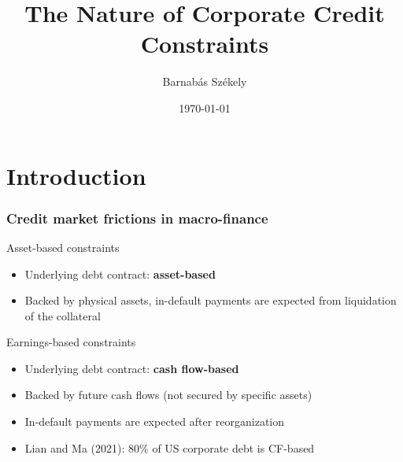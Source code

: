 \documentclass[notes]{beamer}
\title[]{The Nature of Corporate Credit Constraints} %
\author{Barnab\'as Sz\'ekely} %
\date{\today } %
\begin{document}
\renewcommand{\arraystretch}{1.4}

\begin{frame}
\titlepage %
\end{frame}


\section{Introduction}

\begin{frame}[label=intro1] \frametitle{Credit market frictions in macro-finance}
Asset-based constraints
\begin{itemize}
 \setlength\itemsep{0em}
    \item Underlying debt contract: \textbf{asset-based}
    \item Backed by physical assets, in-default payments are expected from liquidation of the collateral
\end{itemize} 

Earnings-based constraints
\begin{itemize}
 \setlength\itemsep{0em}
    \item Underlying debt contract: \textbf{cash flow-based}
    \item Backed by future cash flows (not secured by specific assets) 
    \item In-default payments are expected after reorganization
    \item Lian and Ma (2021): 80\% of US corporate debt is CF-based
\end{itemize} \vspace{1mm}
\begin{center}
\hyperlink{secUnsec}{} 
\end{center}
\end{frame}
\end{document}
